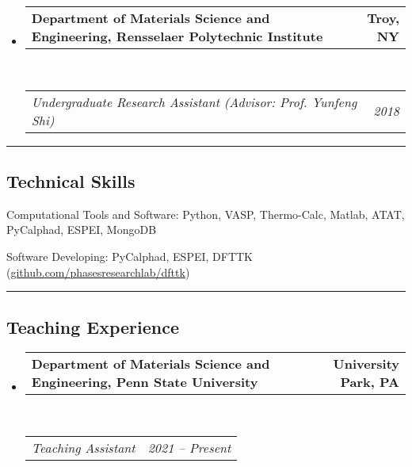 \documentclass[10pt,letterpaper]{article}
\makeatletter
\newenvironment{indentsection}[1]%
{\begin{list}{}%
  {\setlength{\leftmargin}{#1}}%
  \item[]%
}
{\end{list}}
\newcommand{\headerrow}[2]
{\begin{tabular*}{\linewidth}{l@{\extracolsep{\fill}}r}
  #1 &
  #2 \\
\end{tabular*}}
\makeatother
\begin{document}
\begin{itemize}
  \item
  \headerrow
    {\textbf{Department of Materials Science and Engineering, Rensselaer Polytechnic Institute}}
    {\textbf{Troy, NY}}
  \\
  \headerrow
    {\emph{Undergraduate Research Assistant (Advisor: Prof. Yunfeng Shi)}}
    {\emph{2018}}

\end{itemize}

\hrule
\vspace{-0.6em}
\subsection*{Technical Skills}

\begin{indentsection}{\parindent}
\begin{description*}
  \item[Computational Tools and Software:]
  Python, VASP, Thermo-Calc, Matlab, ATAT, PyCalphad, ESPEI, MongoDB
  \item [Software Developing:]
  PyCalphad, ESPEI, DFTTK (\href{https://github.com/PhasesResearchLab/DFTTK}{github.com/phasesresearchlab/dfttk})
\end{description*}
\end{indentsection}

\hrule
\vspace{-0.6em}
\subsection*{Teaching Experience}

\renewcommand\labelitemiii{$\circ$}
\begin{itemize}
    \parskip=0.1em

    \item
    \headerrow
    {\textbf{Department of Materials Science and Engineering, Penn State University}}
    {\textbf{University Park, PA}}
    \\
    \headerrow
    {\emph{Teaching Assistant}}
    {\emph{2021 -- Present}}
\end{itemize}
\end{document}
